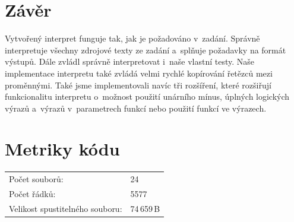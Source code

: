 \documentclass[12pt,a4paper,titlepage,final]{article}
\begin{document}
\section{Závěr} \label{zaver}
Vytvořený interpret funguje tak, jak je požadováno v~zadání. Správně interpretuje 
všechny zdrojové texty ze zadání a~splňuje požadavky na formát výstupů. Dále zvládl 
správně interpretovat i~naše vlastní testy. Naše implementace interpretu také zvládá 
velmi rychlé kopírování řetězců mezi proměnnými. Také jsme implementovali navíc tři 
rozšíření, které rozšiřují funkcionalitu interpretu o~možnost použití unárního mínus, 
úplných logických výrazů a~výrazů v~parametrech funkcí nebo použití funkcí ve výrazech.

\section{Metriky kódu} \label{metriky}
\begin{tabular}{ll}
  Počet souborů: & 24 \\
  Počet řádků: & 5577 \\
  Velikost spustitelného souboru: & 74\,659\,B \\
\end{tabular}

%
%
%
\appendix

\end{document}
